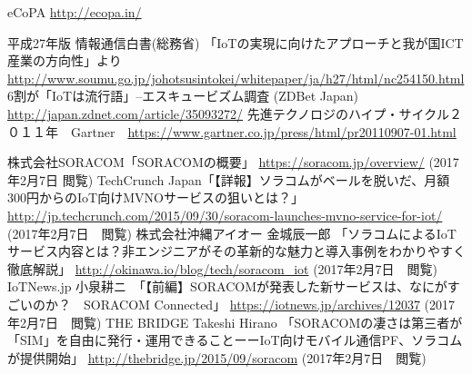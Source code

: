 
\begin{thebibliography}{99}
 eCoPA \url{http://ecopa.in/}

 平成27年版 情報通信白書(総務省) 「IoTの実現に向けたアプローチと我が国ICT産業の方向性」より \url{http://www.soumu.go.jp/johotsusintokei/whitepaper/ja/h27/html/nc254150.html}
 6割が「IoTは流行語」--エスキュービズム調査 (ZDBet Japan) \url{http://japan.zdnet.com/article/35093272/}
 先進テクノロジのハイプ・サイクル２０１１年　Gartner　\url{https://www.gartner.co.jp/press/html/pr20110907-01.html}


 株式会社SORACOM「SORACOMの概要」 \url{https://soracom.jp/overview/} (2017年2月7日 閲覧)
 TechCrunch Japan「【詳報】ソラコムがベールを脱いだ、月額300円からのIoT向けMVNOサービスの狙いとは？」 \url{http://jp.techcrunch.com/2015/09/30/soracom-launches-mvno-service-for-iot/} (2017年2月7日　閲覧)
 株式会社沖縄アイオー 金城辰一郎 「ソラコムによるIoTサービス内容とは？非エンジニアがその革新的な魅力と導入事例をわかりやすく徹底解説」 \url{http://okinawa.io/blog/tech/soracom_iot} (2017年2月7日　閲覧)
 IoTNews.jp 小泉耕ニ　「【前編】SORACOMが発表した新サービスは、なにがすごいのか？　SORACOM Connected」 \url{https://iotnews.jp/archives/12037} (2017年2月7日　閲覧)
 THE BRIDGE Takeshi Hirano 「SORACOMの凄さは第三者が「SIM」を自由に発行・運用できることーーIoT向けモバイル通信PF、ソラコムが提供開始」 \url{http://thebridge.jp/2015/09/soracom} (2017年2月7日　閲覧)
\end{thebibliography}
